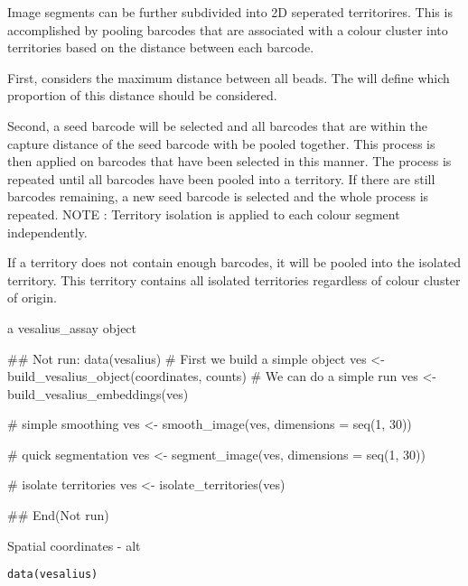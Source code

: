 \documentclass[a4paper]{book}
\begin{document}
\begin{Details}
Image segments can be further subdivided into 2D
seperated territorires. This is accomplished by pooling barcodes
that are associated with a colour cluster into territories based on the
distance between each barcode.

First,  considers the maximum distance
between all beads. The  will define which 
proportion of this distance should be considered.

Second, a seed barcode will be selected and all barcodes that are within the
capture distance of the seed barcode with be pooled together. This process
is then applied on barcodes that have been selected in this manner. The
process is repeated until all barcodes have been pooled into a territory.
If there are still barcodes remaining, a new seed barcode is selected and the
whole process is repeated. NOTE : Territory isolation is applied to each
colour segment independently.

If a territory does not contain enough barcodes, it will be pooled into the
isolated territory. This territory contains all isolated territories
regardless of colour cluster of origin.
\end{Details}
%
\begin{Value}
a vesalius\_assay object
\end{Value}
%
\begin{Examples}
\begin{ExampleCode}
## Not run: 
data(vesalius)
# First we build a simple object
ves <- build_vesalius_object(coordinates, counts)
# We can do a simple run
ves <- build_vesalius_embeddings(ves)

# simple smoothing
ves <- smooth_image(ves, dimensions = seq(1, 30))

# quick segmentation
ves <- segment_image(ves, dimensions = seq(1, 30))

# isolate territories
ves <- isolate_territories(ves)

## End(Not run)
\end{ExampleCode}
\end{Examples}
%
\begin{Description}
Spatial coordinates - alt
\end{Description}
%
\begin{Usage}
\begin{verbatim}
data(vesalius)
\end{verbatim}
\end{Usage}
\end{document}
